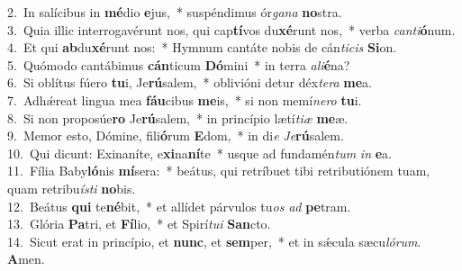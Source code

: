 {2.~}In salícibus in \textbf{mé}dio \textbf{e}jus,~* suspéndimus ór\textit{ga}\textit{na} \textbf{no}stra.\\
{3.~}Quia illic interrogavérunt nos, qui cap\textbf{tí}vos du\textbf{xé}runt nos,~* verba \textit{can}\textit{ti}\textbf{ó}num.\\
{4.~}Et qui \textbf{ab}du\textbf{xé}runt nos:~* Hymnum cantáte nobis de cán\textit{ti}\textit{cis} \textbf{Si}on.\\
{5.~}Quómodo cantábimus \textbf{cán}ticum \textbf{Dó}mini~* in terra \textit{a}\textit{li}\textbf{é}na?\\
{6.~}Si oblítus fúero \textbf{tu}i, Je\textbf{rú}salem,~* oblivióni detur déx\textit{te}\textit{ra} \textbf{me}a.\\
{7.~}Adhǽreat lingua mea \textbf{fáu}cibus \textbf{me}is,~* si non memí\textit{ne}\textit{ro} \textbf{tu}i.\\
{8.~}Si non proposúe\textbf{ro} Je\textbf{rú}salem,~* in princípio lætí\textit{ti}\textit{æ} \textbf{me}æ.\\
{9.~}Memor esto, Dómine, fili\textbf{ó}rum \textbf{E}dom,~* in di\textit{e} \textit{Je}\textbf{rú}salem.\\
{10.~}Qui dicunt: Exinaníte, e\textbf{xi}na\textbf{ní}te~* usque ad fundamén\textit{tum} \textit{in} \textbf{e}a.\\
{11.~}Fília Baby\textbf{ló}nis \textbf{mí}sera:~* beátus, qui retríbuet tibi retributiónem tuam, quam retribu\textit{í}\textit{sti} \textbf{no}bis.\\
{12.~}Beátus \textbf{qui} te\textbf{né}bit,~* et allídet párvulos tu\textit{os} \textit{ad} \textbf{pe}tram.\\
{13.~}Glória \textbf{Pa}tri, et \textbf{Fí}lio,~* et Spirí\textit{tu}\textit{i} \textbf{San}cto.\\
{14.~}Sicut erat in princípio, et \textbf{nunc}, et \textbf{sem}per,~* et in sǽcula sæcu\textit{ló}\textit{rum}. \textbf{A}men.\\
